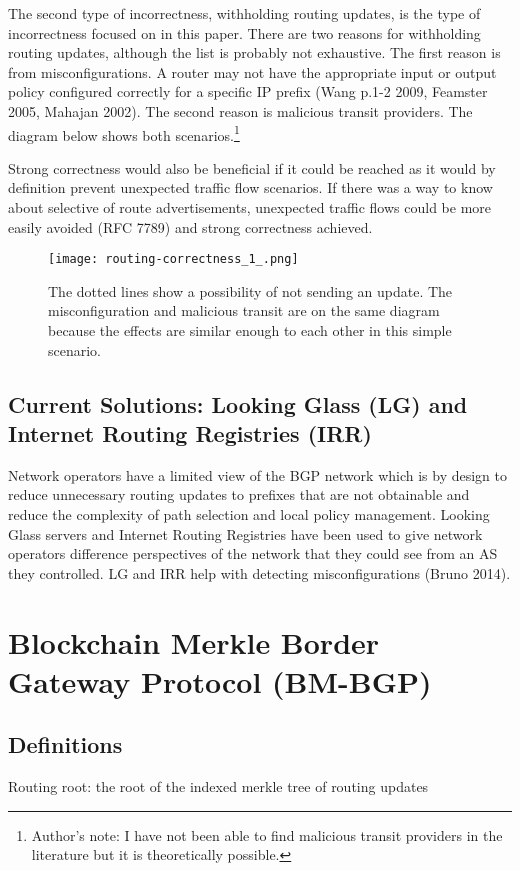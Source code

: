 \documentclass[letterpaper, 10 pt, conference]{ieeeconf}  %
\begin{document}
The second type of incorrectness, withholding routing updates, is the type of incorrectness focused on in this paper. There are two reasons for withholding routing updates, although the list is probably not exhaustive. The first reason is from misconfigurations. A router may not have the appropriate input or output policy configured correctly for a specific IP prefix (Wang p.1-2 2009, Feamster 2005, Mahajan 2002). The second reason is malicious transit providers. The diagram below shows both scenarios.\footnote{Author's note: I have not been able to find malicious transit providers in the literature but it is theoretically possible.}

Strong correctness would also be beneficial if it could be reached as it would by definition prevent unexpected traffic flow scenarios. If there was a way to know about selective of route advertisements, unexpected traffic flows could be more easily avoided (RFC 7789) and strong correctness achieved. 


\begin{figure}[!ht]
	\centering
	\texttt{[image: routing-correctness\_1\_.png]}
    \caption{The dotted lines show a possibility of not sending an update. The misconfiguration and malicious transit are on the same diagram because the effects are similar enough to each other in this simple scenario.  
}

\end{figure}

\subsection{Current Solutions: Looking Glass (LG) and Internet Routing Registries (IRR)}

Network operators have a limited view of the BGP network which is by design to reduce unnecessary routing updates to prefixes that are not obtainable and reduce the complexity of path selection and local policy management. Looking Glass servers and Internet Routing Registries have been used to give network operators difference perspectives of the network that they could see from an AS they controlled. LG and IRR help with detecting misconfigurations (Bruno 2014).

\section{Blockchain Merkle Border Gateway Protocol (BM-BGP)}

\subsection{Definitions}
Routing root: the root of the indexed merkle tree of routing updates
\end{document}
